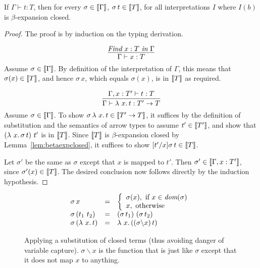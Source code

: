 \begin{theorem}
  \label{thm:stlcsnd}
  If $\Gamma\vdash t : T$, then for every $\sigma\in\llbracket \Gamma \rrbracket$, $\sigma\, t \in \llbracket T \rrbracket$,
  for all interpretations $I$ where $I(b)$ is $\beta$-expansion closed.
\end{theorem}
\begin{proof}
  The proof is by induction on the typing derivation.

  \case{ }
\[  \infer{\Gamma\vdash x : T}{\textit{Find}\ x:T\ \textit{in}\ \Gamma} 
\]
Assume $\sigma \in \llbracket \Gamma \rrbracket$.  By definition of the interpretation
of $\Gamma$, this means that $\sigma(x) \in\llbracket T \rrbracket$, and hence $\sigma\,x$, which equals $\sigma(x)$,
is in $\llbracket T \rrbracket$ as required.

  \case{ }
\[  \infer{\Gamma\vdash \lam{x}{t} : T' \to T}
      {\Gamma,x:T'\vdash t:T}
\]
Assume $\sigma\in\llbracket \Gamma \rrbracket$.  To show $\sigma\,\lambda\ x.\, t\in\llbracket T'\to T \rrbracket$, it suffices
by the definition of substitution and the semantics of arrow types to assume $t'\in\llbracket T' \rrbracket$,
and show that $(\lambda\ x.\, \sigma\, t)\ t'$ is in $\llbracket T \rrbracket$.  Since $\llbracket T \rrbracket$ is $\beta$-expansion closed
by Lemma~\ref{lem:betaexpclosed}, it suffices to show $[t'/x]\sigma\, t\in\llbracket T \rrbracket$.

Let $\sigma'$ be the same as $\sigma$ except that $x$ is mapped to $t'$.
Then $\sigma'\in\llbracket \Gamma,x:T' \rrbracket$, since $\sigma'(x)\in\llbracket T \rrbracket$.  The desired conclusion
now follows directly by the induction hypothesis.
\end{proof}

\begin{figure}
  \[
  \begin{array}{lll}
    \sigma\, x & = & \left\{\begin{array}{ll}
                           \sigma(x),\textnormal{ if }x\in\textit{dom}(\sigma) \\
                           x,\textnormal{ otherwise}
                           \end{array} \right. \\
    \sigma\, (t_1\ t_2) & = & (\sigma\, t_1)\ (\sigma\, t_2) \\
    \sigma\, (\lambda\ x.\, t) & = & \lambda\ x.\, ((\sigma \backslash x)\, t)
  \end{array}
  \]
  \caption{Applying a substitution of closed terms (thus avoiding danger of variable capture).
    $\sigma \backslash x$ is the function that is just like $\sigma$ except that it does not
  map $x$ to anything.}
  
\label{fig:substsigma}
\end{figure}

